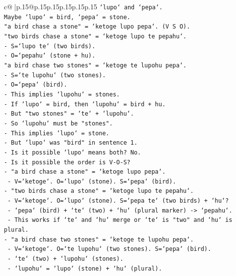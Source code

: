 \documentclass{article}
\begin{document}
{\begin{supertabular}{c@{$\;$}|p{.15\linewidth}@{}p{.15\linewidth}p{.15\linewidth}p{.15\linewidth}p{.15\linewidth}p{.15\linewidth}}
{{{\texttt{`lupo` and `pepa`.} \\
\texttt{Maybe `lupo` = bird, `pepa` = stone.} \\
\texttt{"a bird chase a stone" = `ketoge lupo pepa`. (V S O).} \\
\texttt{"two birds chase a stone" = `ketoge lupo te pepahu`.} \\
\texttt{{-} S=`lupo te` (two birds).} \\
\texttt{{-} O=`pepahu` (stone + hu).} \\
\texttt{"a bird chase two stones" = `ketoge te lupohu pepa`.} \\
\texttt{{-} S=`te lupohu` (two stones).} \\
\texttt{{-} O=`pepa` (bird).} \\
\texttt{{-} This implies `lupohu` = stones.} \\
\texttt{{-} If `lupo` = bird, then `lupohu` = bird + hu.} \\
\texttt{{-} But "two stones" = `te` + `lupohu`.} \\
\texttt{{-} So `lupohu` must be "stones".} \\
\texttt{{-} This implies `lupo` = stone.} \\
\texttt{{-} But `lupo` was "bird" in sentence 1.} \\
\texttt{{-} Is it possible `lupo` means both? No.} \\
\texttt{{-} Is it possible the order is V{-}O{-}S?} \\
\texttt{{-} "a bird chase a stone" = `ketoge lupo pepa`.} \\
\texttt{  {-} V=`ketoge`. O=`lupo` (stone). S=`pepa` (bird).} \\
\texttt{{-} "two birds chase a stone" = `ketoge lupo te pepahu`.} \\
\texttt{  {-} V=`ketoge`. O=`lupo` (stone). S=`pepa te` (two birds) + `hu`?} \\
\texttt{  {-} `pepa` (bird) + `te` (two) + `hu` (plural marker) {-}> `pepahu`.} \\
\texttt{  {-} This works if `te` and `hu` merge or `te` is "two" and `hu` is plural.} \\
\texttt{{-} "a bird chase two stones" = `ketoge te lupohu pepa`.} \\
\texttt{  {-} V=`ketoge`. O=`te lupohu` (two stones). S=`pepa` (bird).} \\
\texttt{  {-} `te` (two) + `lupohu` (stones).} \\
\texttt{  {-} `lupohu` = `lupo` (stone) + `hu` (plural).} \\
}}}
\end{supertabular}}
\end{document}
